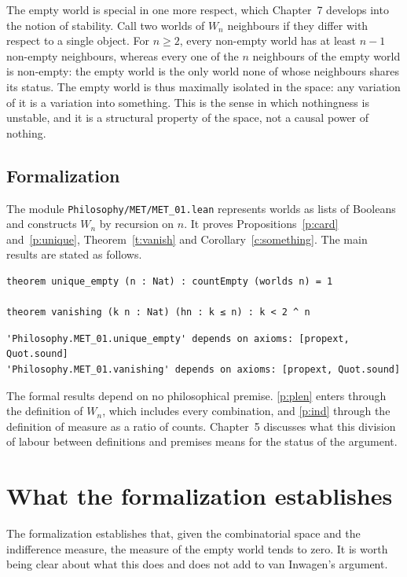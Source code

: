 \documentclass{situationist-preprint}
\begin{document}
The empty world is special in one more respect, which Chapter~7 develops into the notion of stability. Call two worlds of $W_n$ neighbours if they differ with respect to a single object. For $n \geq 2$, every non-empty world has at least $n - 1$ non-empty neighbours, whereas every one of the $n$ neighbours of the empty world is non-empty: the empty world is the only world none of whose neighbours shares its status. The empty world is thus maximally isolated in the space: any variation of it is a variation into something. This is the sense in which nothingness is unstable, and it is a structural property of the space, not a causal power of nothing.

\subsection*{Formalization}

The module \nolinkurl{Philosophy/MET/MET_01.lean} represents worlds as lists of Booleans and constructs $W_n$ by recursion on $n$. It proves Propositions~\ref{p:card} and~\ref{p:unique}, Theorem~\ref{t:vanish} and Corollary~\ref{c:something}. The main results are stated as follows.

\begin{lstlisting}
theorem unique_empty (n : Nat) : countEmpty (worlds n) = 1

theorem vanishing (k n : Nat) (hn : k ≤ n) : k < 2 ^ n
\end{lstlisting}

\begin{lstlisting}
'Philosophy.MET_01.unique_empty' depends on axioms: [propext, Quot.sound]
'Philosophy.MET_01.vanishing' depends on axioms: [propext, Quot.sound]
\end{lstlisting}

The formal results depend on no philosophical premise. \ref{p:plen} enters through the definition of $W_n$, which includes every combination, and \ref{p:ind} through the definition of measure as a ratio of counts. Chapter~5 discusses what this division of labour between definitions and premises means for the status of the argument.

\section{What the formalization establishes}

The formalization establishes that, given the combinatorial space and the indifference measure, the measure of the empty world tends to zero. It is worth being clear about what this does and does not add to van Inwagen's argument.
\end{document}
